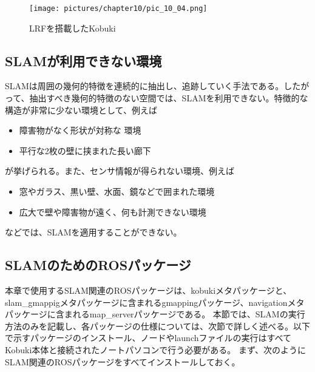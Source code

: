 \begin{figure}[htp]
  \centering
  \texttt{[image: pictures/chapter10/pic\_10\_04.png]}
  \caption{LRFを搭載したKobuki}
\end{figure}

\subsection{SLAMが利用できない環境}

SLAMは周囲の幾何的特徴を連続的に抽出し、追跡していく手法である。したがって、抽出すべき幾何的特徴のない空間では、SLAMを利用できない。特徴的な構造が非常に少ない環境として、例えば

\vspace{\baselineskip}
\begin{itemize}
\item  障害物がなく形状が対称な  環境
\item 平行な2枚の壁に挟まれた長い廊下
\end{itemize}
\vspace{\baselineskip}

が挙げられる。また、センサ情報が得られない環境、例えば

\vspace{\baselineskip}
\begin{itemize}
\item 窓やガラス、黒い壁、水面、鏡などで囲まれた環境
\item 広大で壁や障害物が遠く、何も計測できない環境
\end{itemize}
\vspace{\baselineskip}

などでは、SLAMを適用することができない。

\subsection{SLAMのためのROSパッケージ}

本章で使用するSLAM関連のROSパッケージは、kobukiメタパッケージと、slam\_gmappigメタパッケージに含まれるgmappingパッケージ、navigationメタパッケージに含まれるmap\_serverパッケージである。 本節では、SLAMの実行方法のみを記載し、各パッケージの仕様については、次節で詳しく述べる。以下で示すパッケージのインストール、ノードやlaunchファイルの実行はすべてKobuki本体と接続されたノートパソコンで行う必要がある。
まず、次のようにSLAM関連のROSパッケージをすべてインストールしておく。

